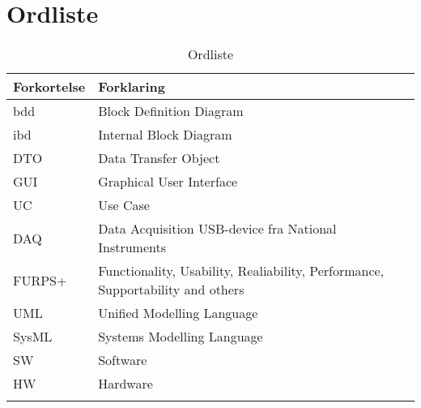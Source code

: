 \chapter{Ordliste}


\begin{longtabu} to 
	\textbf{Forkortelse} & \textbf{Forklaring} \\[-1ex]
	\midrule
	 bdd & Block Definition Diagram \\[-1ex]
	 ibd & Internal Block Diagram \\[-1ex]
	 DTO & Data Transfer Object \\[-1ex]
	 GUI & Graphical User Interface \\[-1ex]
	 UC  & Use Case \\[-1ex]
	 DAQ & Data Acquisition USB-device fra National Instruments \\[-1ex]
	 FURPS+ & Functionality, Usability, Realiability, Performance, Supportability and others\\[-1ex]
	 UML & Unified Modelling Language \\[-1ex]
	 SysML & Systems Modelling Language \\[-1ex]
	 SW & Software \\[-1ex]
	 HW & Hardware \\[-1ex]


	\caption{Ordliste}
\end{longtabu}
